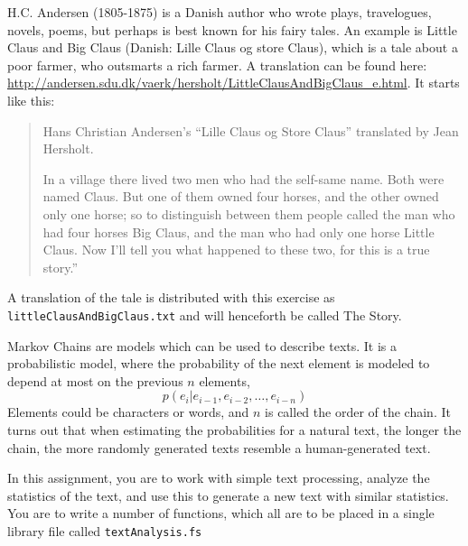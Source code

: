 H.C. Andersen (1805-1875) is a Danish author who wrote plays, travelogues, novels, poems, but perhaps is best known for his fairy tales. An example is Little Claus and Big Claus (Danish: Lille Claus og store Claus), which is a tale about a poor farmer, who outsmarts a rich farmer. A translation can be found here: \url{http://andersen.sdu.dk/vaerk/hersholt/LittleClausAndBigClaus_e.html}. It starts like this:
\begin{quote}
  Hans Christian Andersen's ``Lille Claus og Store Claus'' translated by Jean Hersholt.

In a village there lived two men who had the self-same name. Both were named Claus. But one of them owned four horses, and the other owned only one horse; so to distinguish between them people called the man who had four horses Big Claus, and the man who had only one horse Little Claus. Now I'll tell you what happened to these two, for this is a true story.''
\end{quote}
A translation of the tale is distributed with this exercise as \lstinline[language=console]{littleClausAndBigClaus.txt} and will henceforth be called The Story.

Markov Chains are models which can be used to describe texts. It is a probabilistic model, where the probability of the next element is modeled to depend at most on the previous $n$ elements,
\begin{equation}
  \label{eq:1}
  p(e_i | e_{i-1}, e_{i-2},\ldots,e_{i-n})
\end{equation}
Elements could be characters or words, and $n$ is called the order of the chain. It turns out that when estimating the probabilities for a natural text, the longer the chain, the more randomly generated texts resemble a human-generated text.

In this assignment, you are to work with simple text processing, analyze the statistics of the text, and use this to generate a new text with similar statistics. You are to write a number of functions, which all are to be placed in a single library file called \lstinline[language=console]{textAnalysis.fs}
